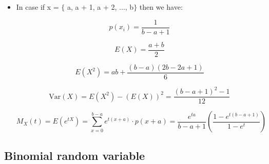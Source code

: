 \documentclass[12pt]{report}
\renewcommand{\_}{\kern-1.5pt\textunderscore\kern-1.5pt}
\begin{document}
\begin{itemize}
\begin{itemize}
	\item In case if x = $ \{ $ a, a + 1, a + 2, ..., b$ \} $  then we have:\par

 \[ p \left( x_{i} \right) =\frac{1}{b-a+1} \] \par

 \[ E \left( X \right) =\frac{a+b}{2} \] \par

 \[ E \left( X^{2} \right) =ab+\frac{ \left( b-a \right)  \left( 2b-2a+1 \right) }{6} \] \par

 \[ \mathrm{Var} \left( X \right) =E \left( X^{2} \right) - \left( E \left( X \right)  \right) ^{2}=\frac{ \left( b-a+1 \right) ^{2}-1}{12} \] \par

 \[ M_{X} \left( t \right) =E \left( e^{tX} \right) = \sum _{x=0}^{b-a}e^{t \left( x+a \right) } \cdot p \left( x+a \right) =\frac{e^{ta}}{b-a+1} \left( \frac{1-e^{t \left( b-a+1 \right) }}{1-e^{t}} \right)  \] \par


\end{itemize}
\end{itemize}\subsection*{Binomial random variable}
\end{document}
